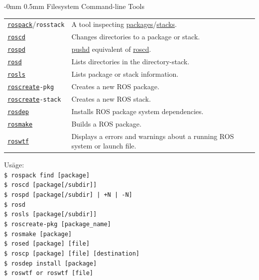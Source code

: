 \documentclass[10pt,landscape]{article}
\makeatletter
\renewcommand{\section}{\@startsection{section}{1}{0mm}%
                                {-0mm} %
                                {0.5mm}%
                                {\normalfont\large\bfseries}}
\makeatother
\begin{document}
\begin{multicols}{3}
\section{Filesystem Command-line Tools}
\vspace{1.5mm}
\begin{tabular}{@{}p{\the\MyLen}%
                @{}p{\linewidth-\the\MyLen}@{}}
\texttt{\href{http://wiki.ros.org/rospack}{rospack}}/\texttt{rosstack} & A tool inspecting \href{http://wiki.ros.org/Packages}{packages}/\href{http://wiki.ros.org/rosbuild/Stacks}{stacks}. \\
\texttt{\href{http://wiki.ros.org/rosbash\#roscd}{roscd}} & Changes directories to a package or stack. \\
\texttt{\href{http://wiki.ros.org/rosbash\#rospd}{rospd}} & \href{http://ftp.gnu.org/old-gnu/Manuals/bash-2.05a/html\_node/bashref\_73.html}{pushd} equivalent of \href{http://wiki.ros.org/rosbash\#roscd}{roscd}. \\
\texttt{\href{http://wiki.ros.org/rosbash\#rosd}{rosd}} & Lists directories in the directory-stack. \\
\texttt{\href{http://wiki.ros.org/rosbash\#rosls}{rosls}} & Lists package or stack information. \\
\texttt{\href{http://wiki.ros.org/roscreate}{roscreate}-pkg} & Creates a new ROS package. \\
\texttt{\href{http://wiki.ros.org/roscreate}{roscreate}-stack} & Creates a new ROS stack.\\
\texttt{\href{http://wiki.ros.org/rosdep}{rosdep}} & Installs ROS package system dependencies.\\
\texttt{\href{http://wiki.ros.org/rosmake}{rosmake}} & Builds a ROS package.\\
\texttt{\href{http://wiki.ros.org/roswtf}{roswtf}} & Displays a errors and warnings about a running ROS system or launch file.\\
\end{tabular}

\begin{tabbing}
Us\=age:\\
\> \texttt{\$ rospack find [package]}\\  
\> \texttt{\$ roscd [package[/subdir]]}\\
\> \texttt{\$ rospd [package[/subdir] | +N | -N]}\\
\> \texttt{\$ rosd}\\
\> \texttt{\$ rosls [package[/subdir]]}\\
\> \texttt{\$ roscreate-pkg [package\_name]}\\
\> \texttt{\$ rosmake [package]}\\
\> \texttt{\$ rosed [package] [file]}\\
\> \texttt{\$ roscp [package] [file] [destination]}\\
\> \texttt{\$ rosdep install [package]}\\
\> \texttt{\$ roswtf or roswtf [file]}\\
\end{tabbing}


\end{multicols}
\end{document}
